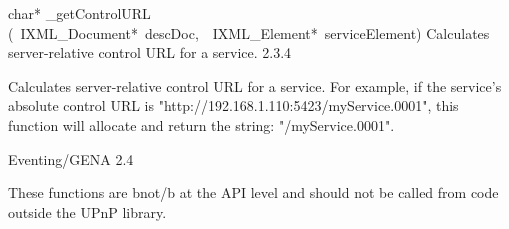 \documentclass{article}
\begin{document}
\begin{cxxentry}
\begin{cxxentry}
\begin{cxxfunction}
\begin{cxxdoc}
\end{cxxdoc}
\end{cxxfunction}
\begin{cxxfunction}
{char*}
        {\_getControlURL}
        {(\ IXML\_Document*\ descDoc,\ \ IXML\_Element*\ serviceElement)}
        {Calculates server-relative control URL for a service.}
        {2.3.4}
\begin{cxxdoc}
Calculates server-relative control URL for a service.  For example, if the
service's absolute control URL is "http://192.168.1.110:5423/myService.0001",
this function will allocate and return the string: "/myService.0001".


\end{cxxdoc}
\end{cxxfunction}
\end{cxxentry}
\begin{cxxentry}
{}
        {Eventing/GENA}
        {}
        {}
        {2.4}
\begin{cxxdoc}
These functions are \<b\>not\</b\> at the API level and should not be called from
code outside the UPnP library. 
\end{cxxdoc}
\end{cxxentry}
\end{cxxentry}
\end{document}
